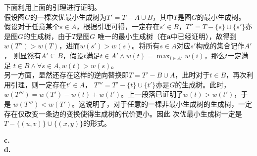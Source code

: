 \begin{solution}
    下面利用上面的引理进行证明。\\
    假设图$G$的一棵次优最小生成树为$T'=T-A\cup B$，其中$T$是图$G$的最小生成树。
    假设对于任意某个$s\in A$，根据引理可得，一定存在$s'\in B$，$T''=T-\{s\}\cup \{s'\}$亦是图$G$的生成树，由于$T$是图$G$
    唯一的最小生成树（在\textbf{a}中已经证明），故得到$w(T'')>w(T)$，进而$w(s')>w(s)$。将所有$s\in A$对应$s'$构成的集合记作$A'$，
    则显然有$A'\subseteq B$，假设$t$满足$t\in A' \wedge w(t) = \max_{i \in A'} w(i)$，那么$t$一定满足
    $t \in B \wedge \forall s \in A, w(t)>w(s)$。\\
    另一方面，显然还存在这样的逆向替换即$T=T'-B\cup A$，此时对于$t \in B$，再次利用引理，则一定存在$t' \in A$，
    $T'''=T'-\{t\}\cup \{t'\}$亦是$G$的生成树。此时，$w(T''') = w(T') - w(t) + w(t')$。上一段落已证明了$w(t)>w(t')$，于是
    $w(T''') < w(T')$。这说明了，对于任意的一棵非最小生成树的生成树，一定存在仅改变一条边的变换使得生成树的代价更小。因此
    次优最小生成树一定是$T-\{(u,v)\}\cup\{(x,y)\}$的形式。

    \textbf{c.}\\
    \textbf{d.}\\
\end{solution}